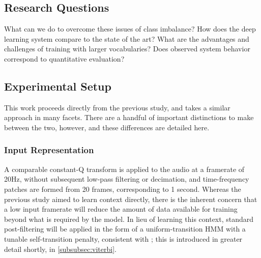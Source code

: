 \subsection{Research Questions}
\label{subsec:research_questions}

What can we do to overcome these issues of class imbalance?
How does the deep learning system compare to the state of the art?
What are the advantages and challenges of training with larger vocabularies?
Does observed system behavior correspond to quantitative evaluation?



\subsection{Experimental Setup}
\label{subsec:experimental_setup}
This work proceeds directly from the previous study, and takes a similar approach in many facets.
There are a handful of important distinctions to make between the two, however, and these differences are detailed here.

\subsubsection{Input Representation}
\label{subsubsec:data_considerations}
A comparable constant-Q transform is applied to the audio at a framerate of 20Hz, without subsequent low-pass filtering or decimation, and time-frequency patches are formed from 20 frames, corresponding to 1 second.
Whereas the previous study aimed to learn context directly, there is the inherent concern that a low input framerate will reduce the amount of data available for training beyond what is required by the model.
In lieu of learning this context, standard post-filtering will be applied in the form of a uniform-transition HMM with a tunable self-transition penalty, consistent with \cite{Cho2014PhD}; this is introduced in greater detail shortly, in \ref{subsubsec:viterbi}.

